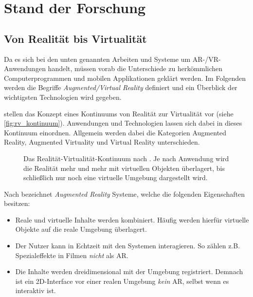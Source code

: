 \chapter{Stand der Forschung}
\label{chap:related_work}

\section{Von Realität bis Virtualität}
Da es sich bei den unten genannten Arbeiten und Systeme um AR-/VR-Anwendungen handelt, müssen vorab die Unterschiede zu herkömmlichen Computerprogrammen und mobilen Applikationen geklärt werden.
Im Folgenden werden die Begriffe \emph{Augmented/Virtual Reality} definiert und ein Überblick der wichtigsten Technologien wird gegeben.

\textcite{Milgram1994} stellen das Konzept eines Kontinuums von Realität zur Virtualität vor (siehe \autoref{fig:rv_kontinuum}).
Anwendungen und Technologien lassen sich dabei in dieses Kontinuum einordnen.
Allgemein werden dabei die Kategorien Augmented Reality, Augmented Virtuality und Virtual Reality unterschieden.
\begin{figure}[b]
    \centering
    \caption{Das Realität-Virtualität-Kontinuum nach \textcite{Milgram1994}. Je nach Anwendung wird die Realität mehr und mehr mit virtuellen Objekten überlagert, bis schließlich nur noch eine virtuelle Umgebung dargestellt wird.}
    \label{fig:rv_kontinuum}
\end{figure}
Nach \textcite{Azuma1997} bezeichnet \emph{Augmented Reality} Systeme, welche die folgenden Eigenschaften besitzen:
\begin{itemize}
    \item Reale und virtuelle Inhalte werden kombiniert. Häufig werden hierfür virtuelle Objekte auf die reale Umgebung überlagert.
    \item Der Nutzer kann in Echtzeit mit den Systemen interagieren. So zählen z.B. Spezialeffekte in Filmen \emph{nicht} als AR.
    \item Die Inhalte werden dreidimensional mit der Umgebung registriert. Demnach ist ein 2D-Interface vor einer realen Umgebung \emph{kein} AR, selbst wenn es interaktiv ist.
\end{itemize}
